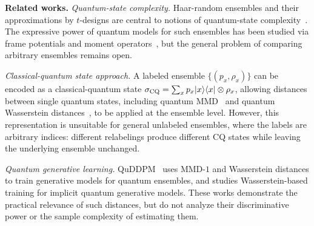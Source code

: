 \documentclass[aps,prx,reprint,superscriptaddress,amsmath,amssymb,longbibliography,floatfix]{revtex4-2}
\providecommand{\ketbra}[2]{|#1\rangle \langle #2|}
\theoremstyle{plain}
\theoremstyle{definition}
\theoremstyle{remark}
\begin{document}
{\bf Related works.}
{\em Quantum-state complexity.}
Haar-random ensembles and their approximations by \(t\)-designs are central to notions of quantum-state complexity~\cite{ambainis2007quantumtdesignstwiseindependence}. The expressive power of quantum models for such ensembles has been studied via frame potentials and moment operators~\cite{roberts2017chaos}, but the general problem of comparing arbitrary ensembles remains open.

{\em Classical-quantum state approach.}
A labeled ensemble \(\{(p_x,\rho_x)\}\) can be encoded as a classical-quantum state \(\sigma_{\rm CQ}=\sum_x p_x \ketbra{x}{x}\otimes \rho_x\), allowing distances between single quantum states, including quantum MMD~\cite{huang2021quantum} and quantum Wasserstein distances~\cite{chakrabarti2019quantum,de2021quantum,zhou2022quantum,kiani2022learning}, to be applied at the ensemble level. However, this representation is unsuitable for general unlabeled ensembles, where the labels are arbitrary indices: different relabelings produce different CQ states while leaving the underlying ensemble unchanged.

{\em Quantum generative learning.}
QuDDPM~\cite{QuDDPM_PhysRevLett.132.100602} uses MMD-\(1\) and Wasserstein distances to train generative models for quantum ensembles, and \citet{tezuka2024generative} studies Wasserstein-based training for implicit quantum generative models. These works demonstrate the practical relevance of such distances, but do not analyze their discriminative power or the sample complexity of estimating them.

\end{document}
